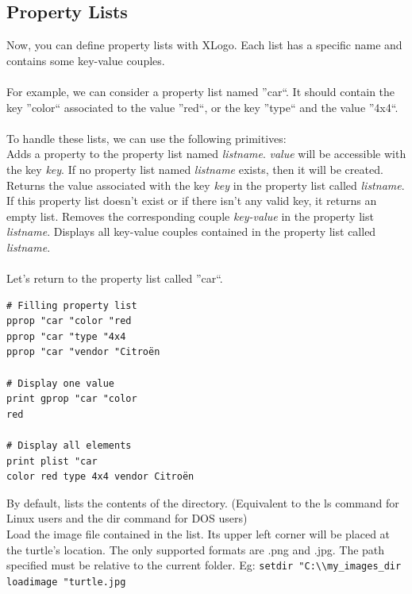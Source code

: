 \subsection{Property Lists}
Now, you can define property lists with XLogo. Each list has a specific name and contains some key-value couples.\\ \\
For example, we can consider a property list named ''car``. It should contain the key ''color`` associated to the value ''red``, or the key ''type`` and the value ''4x4``.\\ \\
To handle these lists, we can use the following primitives:\\
Adds a property to the property list named \textit{listname}. \textit{value} will be accessible with the key \textit{key}. If no property list named \textit{listname} exists, then it will be created. 
Returns the value associated with the key \textit{key} in the property list called \textit{listname}. If this property list doesn't exist or if there isn't any valid key, it returns an empty list.
Removes the corresponding couple \textit{key-value} in the property list \textit{listname}.
Displays all key-value couples contained in the property list called \textit{listname}.\\ \\
Let's return to the property list called ''car``.
\begin{verbatim}
# Filling property list 
pprop "car "color "red
pprop "car "type "4x4
pprop "car "vendor "Citroën

# Display one value
print gprop "car "color
red

# Display all elements
print plist "car
color red type 4x4 vendor Citroën
\end{verbatim}
\noindent {}
By default, lists the contents of the directory. (Equivalent to the ls command for Linux users and the dir command for DOS users)\\
Load the image file contained in the list. Its upper left corner will be placed at the turtle's location. The only supported formats are .png and .jpg. The path specified must be relative to the current folder. Eg: \texttt{setdir "C:\textbackslash\textbackslash my\_images\_dir loadimage "turtle.jpg} \\
